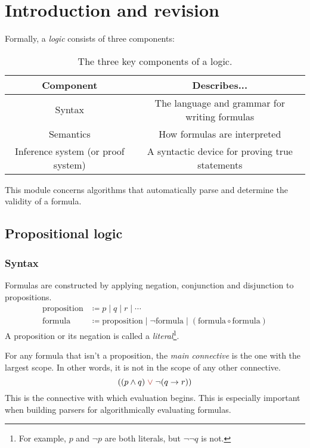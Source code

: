 \section{Introduction and revision}

Formally, a \emph{logic} consists of three components:

\begin{table}[H]
    \centering
    \begin{tabular}{|c|c|}
        \hline
        \textbf{Component} & \textbf{Describes...}\\
        \hline
        Syntax & The language and grammar for writing formulas\\
        \hline
        Semantics & How formulas are interpreted\\
        \hline
        Inference system (or proof system) & A syntactic device for proving true statements\\
        \hline
    \end{tabular}

    \caption{The three key components of a logic.}
    \label{tab:Ch01-components-of-a-logic}
\end{table}

This module concerns algorithms that automatically parse and determine the validity of a formula.


\subsection{Propositional logic}

\subsubsection{Syntax}

Formulas are constructed by applying negation, conjunction and disjunction to propositions. 
%
\begin{align*}
    \text{proposition} &\coloneq p \;\vert\; q \;\vert\; r \;\vert\; \cdots\\
    \text{formula} &\coloneq \text{proposition} \;\vert\; \neg \text{formula} \;\vert\; (\text{formula} \circ \text{formula})  \tag{where \(\circ\) is \(\land\), \(\lor\) or \(\rightarrow\)}
\end{align*}
%
A proposition or its negation is called a \emph{literal}\footnote{For example, \(p\) and \(\neg p\) are both literals, but \(\neg\neg q\) is not.}.

For any formula that isn't a proposition, the \emph{main connective} is the one with the largest scope. In other words, it is not in the scope of any other connective.
%
\[((p \land q) \;{\color{BrickRed} \lor}\; \neg (q \rightarrow r))\]
%
This is the connective with which evaluation begins. This is especially important when building parsers for algorithmically evaluating formulas.


